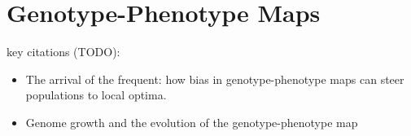 \section{Genotype-Phenotype Maps}

key citations (TODO):
\begin{itemize}
  \item The arrival of the frequent: how bias in genotype-phenotype maps can steer populations to local optima.
  \item Genome growth and the evolution of the genotype-phenotype map
\end{itemize}
